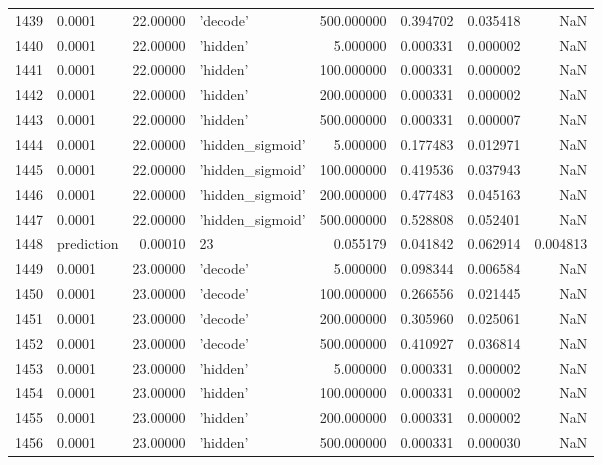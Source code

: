 \documentclass[10pt,a4paper]{article}
\begin{document}
\begin{tabular}{llrlrrrr}
1439 &      0.0001 &  22.00000 &           'decode' &  500.000000 &  0.394702 &  0.035418 &       NaN \\
1440 &      0.0001 &  22.00000 &           'hidden' &    5.000000 &  0.000331 &  0.000002 &       NaN \\
1441 &      0.0001 &  22.00000 &           'hidden' &  100.000000 &  0.000331 &  0.000002 &       NaN \\
1442 &      0.0001 &  22.00000 &           'hidden' &  200.000000 &  0.000331 &  0.000002 &       NaN \\
1443 &      0.0001 &  22.00000 &           'hidden' &  500.000000 &  0.000331 &  0.000007 &       NaN \\
1444 &      0.0001 &  22.00000 &   'hidden\_sigmoid' &    5.000000 &  0.177483 &  0.012971 &       NaN \\
1445 &      0.0001 &  22.00000 &   'hidden\_sigmoid' &  100.000000 &  0.419536 &  0.037943 &       NaN \\
1446 &      0.0001 &  22.00000 &   'hidden\_sigmoid' &  200.000000 &  0.477483 &  0.045163 &       NaN \\
1447 &      0.0001 &  22.00000 &   'hidden\_sigmoid' &  500.000000 &  0.528808 &  0.052401 &       NaN \\
1448 &  prediction &   0.00010 &                 23 &    0.055179 &  0.041842 &  0.062914 &  0.004813 \\
1449 &      0.0001 &  23.00000 &           'decode' &    5.000000 &  0.098344 &  0.006584 &       NaN \\
1450 &      0.0001 &  23.00000 &           'decode' &  100.000000 &  0.266556 &  0.021445 &       NaN \\
1451 &      0.0001 &  23.00000 &           'decode' &  200.000000 &  0.305960 &  0.025061 &       NaN \\
1452 &      0.0001 &  23.00000 &           'decode' &  500.000000 &  0.410927 &  0.036814 &       NaN \\
1453 &      0.0001 &  23.00000 &           'hidden' &    5.000000 &  0.000331 &  0.000002 &       NaN \\
1454 &      0.0001 &  23.00000 &           'hidden' &  100.000000 &  0.000331 &  0.000002 &       NaN \\
1455 &      0.0001 &  23.00000 &           'hidden' &  200.000000 &  0.000331 &  0.000002 &       NaN \\
1456 &      0.0001 &  23.00000 &           'hidden' &  500.000000 &  0.000331 &  0.000030 &       NaN \\

\end{tabular}
\end{document}
